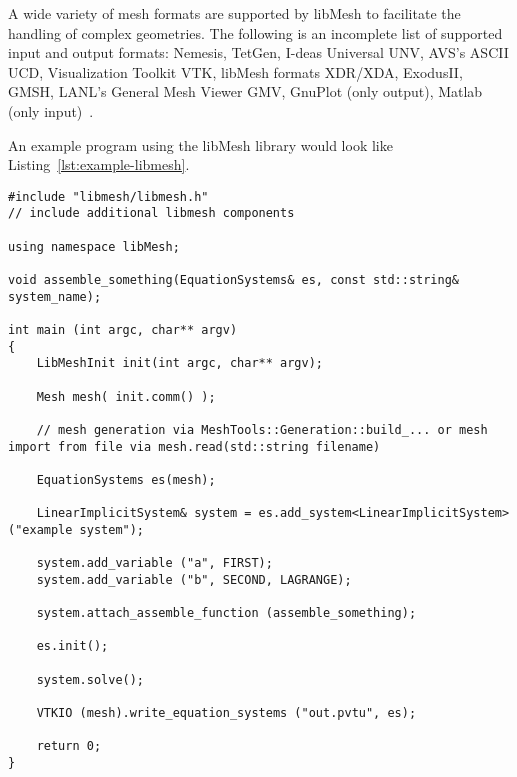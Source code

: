  A wide variety of mesh formats are supported by libMesh to facilitate the handling of complex geometries. The following is an incomplete list of supported input and output formats: Nemesis, TetGen, I-deas Universal UNV, AVS's ASCII UCD, Visualization Toolkit VTK, libMesh formats XDR/XDA, ExodusII, GMSH, LANL's General Mesh Viewer GMV, GnuPlot (only output), Matlab (only input)~\cite{kirk2013case}.
 
 An example program using the libMesh library would look like Listing~\ref{lst:example-libmesh}.
 \begin{lstlisting}[caption=Example libMesh program,label=lst:example-libmesh]
#include "libmesh/libmesh.h"
// include additional libmesh components

using namespace libMesh;

void assemble_something(EquationSystems& es, const std::string& system_name);

int main (int argc, char** argv)
{
	LibMeshInit init(int argc, char** argv);
	
	Mesh mesh( init.comm() );
	
	// mesh generation via MeshTools::Generation::build_... or mesh import from file via mesh.read(std::string filename)
	
	EquationSystems es(mesh);
	
	LinearImplicitSystem& system = es.add_system<LinearImplicitSystem> ("example system");
	
	system.add_variable ("a", FIRST);
	system.add_variable ("b", SECOND, LAGRANGE);
	
	system.attach_assemble_function (assemble_something);

	es.init();
	
	system.solve();
	
	VTKIO (mesh).write_equation_systems ("out.pvtu", es);
	
	return 0;
}
 \end{lstlisting}
